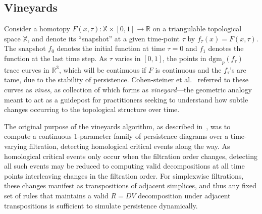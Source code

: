 \documentclass[sn-mathphys]{sn-jnl}
\begin{document}
\subsection{Vineyards}\label{sec:vineyards}
Consider a homotopy $F(x,\tau) : \mathbb{X} \times [0,1] \to \mathbb{R}$ on a triangulable topological space $\mathbb{X}$, and denote its ``snapshot'' at a given time-point $\tau$ by $f_\tau(x) = F(x,\tau)$.
The snapshot $f_0$ denotes the initial function at time $\tau = 0$ and $f_1$ denotes the function at the last time step. 
As $\tau$ varies in $[0,1]$, the points in $\mathrm{dgm}_p(f_\tau)$ trace curves in $\mathbb{R}^3$, which will be continuous if $F$ is continuous and the $f_\tau$'s are tame, due to the stability of persistence.
Cohen-steiner et al.~\cite{cohen2007stability} referred to these curves as \emph{vines}, as collection of which forms as \emph{vineyard}---the geometric analogy meant to act as a guidepost for practitioners seeking to understand how subtle changes occurring to the topological structure over time.

The original purpose of the vineyards algorithm, as described in~\cite{cohen2006vines}, was to compute a continuous 1-parameter family of persistence diagrams over a time-varying filtration, detecting homological critical events along the way.
As homological critical events only occur when the filtration order changes, detecting all such events may be reduced to computing valid decompositions at all time points interleaving  changes in the filtration order. 
For simplexwise filtrations, these changes manifest as transpositions of adjacent simplices, and thus any fixed set of rules that maintains a valid $R = D V$ decomposition under adjacent transpositions is sufficient to simulate persistence dynamically. 
\end{document}
